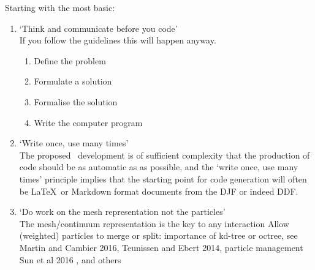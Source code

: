 Starting with the most basic:
\begin{enumerate}
\item `Think and communicate before you code' \\
If you follow the guidelines this will happen anyway.
\begin{enumerate}
\item Define the problem
\item Formulate a solution
\item Formalise the solution
\item Write the computer program
\end{enumerate}
\item `Write once, use many times' \\
The proposed \nep\ development is of sufficient complexity that the production
of code should be as automatic as as possible, and the `write once, use many times'
principle implies that the starting point for code generation will often be \LaTeX \ or Markdown format
documents from the DJF or indeed DDF.
\item  `Do work on the mesh representation not the particles' \\
The mesh/continuum representation is the key to any interaction
Allow (weighted) particles to merge or split: importance of kd-tree or octree,
see Martin and Cambier 2016, Teunissen and Ebert 2014, particle management Sun et al 2016 , and others
\end{enumerate}
